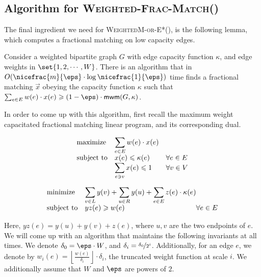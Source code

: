  \subsection{Algorithm for \textsc{Weighted-Frac-Match}()}

The final ingredient we need for \textsc{WeightedM-or-E*}(), is the following lemma, which computes a fractional matching on low capacity edges.

\begin{lemma2}
Consider a weighted bipartite graph $G$ with edge capacity function $\kappa$, and edge weights in $\set{1,2,\cdots,W}$. There is an algorithm that in $O(\nicefrac{m}{\eps}\cdot \log \nicefrac{1}{\eps})$ time finds a fractional matching $\vec{x}$ obeying the capacity function $\kappa$ such that $\sum_{e\in E}w(e)\cdot x(e)\geqslant (1-\eps)\cdot \textsf{mwm}(G,\kappa)$. 
\end{lemma2}

In order to come up with this algorithm, first recall the maximum weight capacitated fractional matching linear program, and its corresponding dual.

\begin{equation}
\begin{array}{ll@{}ll}
\text{maximize}  & \displaystyle\sum\limits_{e\in E} w(e)\cdot x(e)  \\
\text{subject to}& \displaystyle x(e)\leqslant \kappa(e)& & \forall e\in E \\
& \displaystyle \sum_{e\ni v} x(e) \leqslant 1 & & \forall v\in V
\end{array}
\end{equation}

\begin{equation}
\begin{array}{ll@{}ll}
\text{minimize}  & \displaystyle\sum\limits_{v\in L} y(v) +\sum\limits_{u\in R} y(u) +\sum_{e\in E} z(e)\cdot \kappa(e) &  \\
\text{subject to}& \displaystyle yz(e)\geqslant w(e) &  \forall e\in E 
\end{array}
\end{equation}

Here, $yz(e)=y(u)+y(v)+z(e)$, where $u,v$ are the two endpoints of $e$. We will come up with an algorithm that maintains the following invariants at all times. We denote $\delta_0=\eps\cdot W$, and $\delta_{i}=\nicefrac{\delta_0}{2^i}$. Additionally, for an edge $e$, we denote by $w_i(e)=\left\lfloor \frac{w(e)}{\delta_i}\right \rfloor\cdot \delta_i$, the truncated weight function at scale $i$. We additionally assume that $W$ and $\eps$ are powers of $2$. 

